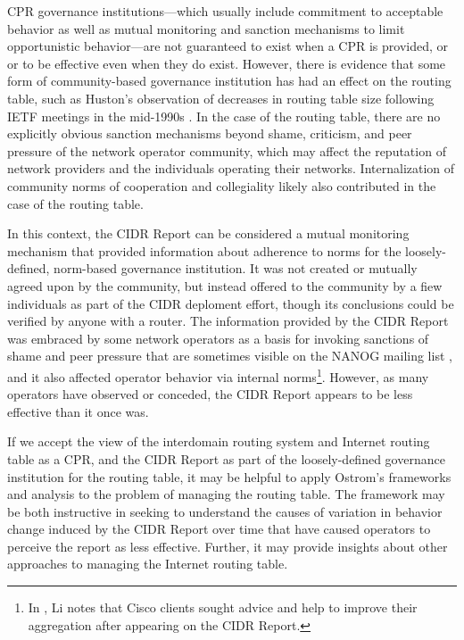 CPR governance institutions---which usually include commitment to acceptable behavior as well as mutual monitoring and sanction mechanisms to limit opportunistic behavior---are not guaranteed to exist when a CPR is provided, or or to be effective even when they do exist. However, there is evidence that some form of community-based governance institution has had an effect on the routing table, such as Huston's observation of decreases in routing table size following IETF meetings in the mid-1990s \cite{Huston:2001bs,Clayton:2010bh}. In the case of the routing table, there are no explicitly obvious sanction mechanisms beyond shame, criticism, and peer pressure of the network operator community, which may affect the reputation of network providers and the individuals operating their networks. Internalization of community norms of cooperation and collegiality \cite{Abbate:2000ve} likely also contributed in the case of the routing table.

In this context, the CIDR Report can be considered a mutual monitoring mechanism that provided information about adherence to norms for the loosely-defined, norm-based governance institution. It was not created or mutually agreed upon by the community, but instead offered to the community by a fiew individuals as part of the CIDR deploment effort, though its conclusions could be verified by anyone with a router. The information provided by the CIDR Report was embraced by some network operators as a basis for invoking sanctions of shame and peer pressure that are sometimes visible on the NANOG mailing list \cite{NANOG}, and it also affected operator behavior via internal norms\footnote{In \cite{Li:2011vn}, Li notes that Cisco clients sought advice and help to improve their aggregation after appearing on the CIDR Report.}. However, as many operators have observed or conceded, the CIDR Report appears to be less effective than it once was.

If we accept the view of the interdomain routing system and Internet routing table as a CPR, and the CIDR Report as part of the loosely-defined governance institution for the routing table, it may be helpful to apply Ostrom's frameworks and analysis to the problem of managing the routing table. The framework may be both instructive in seeking to understand the causes of variation in behavior change induced by the CIDR Report over time that have caused operators to perceive the report as less effective. Further, it may provide insights about other approaches to managing the Internet routing table.

